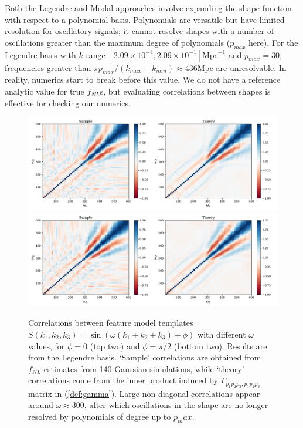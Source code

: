 Both the Legendre and Modal approaches involve expanding the shape function with respect to a polynomial basis. Polynomials are versatile but have limited resolution for oscillatory signals; it cannot resolve shapes with a number of oscillations greater than the maximum degree of polynomials ($p_{max}$ here). For the Legendre basis with $k$ range $[2.09\times 10^{-4}, 2.09\times 10^{-1}]\text{Mpc}^{-1}$ and $p_{max}=30$, frequencies greater than $\pi p_{max} / (k_{max} - k_{min}) \approx 436$Mpc are unresolvable. In reality, numerics start to break before this value. We do not have a reference analytic value for true $f_{NL}$s, but evaluating correlations between shapes is effective for checking our numerics.

\begin{figure}[htbp!] 
	\centering    
	\includegraphics[width=\textwidth]{sine_template_correlations_new.pdf}
	\includegraphics[width=\textwidth]{cosine_template_correlations_new.pdf}
	\caption{Correlations between feature model templates $S(k_1,k_2,k_3)=\sin(\omega (k_1 + k_2 + k_3) + \phi)$ with different $\omega$ values, for $\phi = 0$ (top two) and $\phi = \pi/2$ (bottom two). Results are from the Legendre basis. `Sample' correlations are obtained from $f_{NL}$ estimates from 140 Gaussian simulations, while `theory' correlations come from the inner product induced by $\Gamma_{p_1 p_2 p_3, p_1 p_2 p_3}$ matrix in (\ref{def:gamma}). Large non-diagonal correlations appear around $\omega \approx 300$, after which oscillations in the shape are no longer resolved by polynomials of degree up to $p_max$.}
	\label{fig:feature_template_correlations}
\end{figure}


